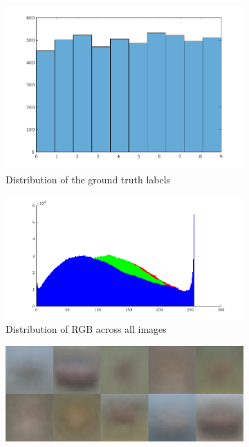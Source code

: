\documentclass{article} %
\begin{document}
    \begin{figure}[h]
        \centering
        \begin{subfigure}{.2\linewidth}
            \centering
            \includegraphics[width=.75\linewidth]{label-distribution.png}
        \caption{Distribution of the ground truth labels}
        \end{subfigure}
        \begin{subfigure}{.2\linewidth}
            \centering
            \includegraphics[width=\linewidth]{hist-overall.png}
        \caption{Distribution of RGB across all images}
        \end{subfigure}
        \begin{subfigure}{.2\linewidth}
            \centering
            \includegraphics[width=\linewidth]{avg-img.png}

\end{subfigure}
\end{figure}
\end{document}
